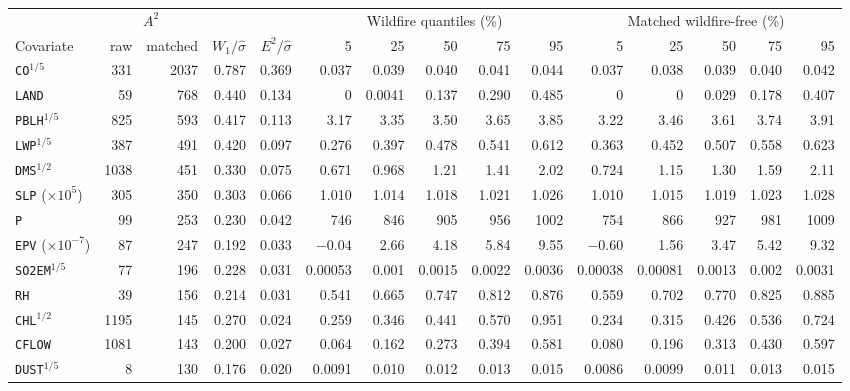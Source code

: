 \documentclass[11pt]{article}
\begin{document}
\begin{center}
\scriptsize
\setlength{\tabcolsep}{2.6pt}
\begin{tabular}{lrrrrrrrrrrrrrr}
\toprule
& \multicolumn{2}{c}{$A^2$} & & & \multicolumn{5}{c}{Wildfire quantiles (\%)} & \multicolumn{5}{c}{Matched wildfire-free (\%)} \\
\cmidrule(lr){2-3}\cmidrule(lr){6-10}\cmidrule(lr){11-15}
Covariate & raw & matched & $W_1/\hat\sigma$ & $E^2/\hat\sigma$ & 5 & 25 & 50 & 75 & 95 & 5 & 25 & 50 & 75 & 95 \\
\midrule
\texttt{CO}$^{1/5}$ & 331 & 2037 & 0.787 & 0.369 & 0.037 & 0.039 & 0.040 & 0.041 & 0.044 & 0.037 & 0.038 & 0.039 & 0.040 & 0.042 \\
\texttt{LAND} & 59 & 768 & 0.440 & 0.134 & 0 & 0.0041 & 0.137 & 0.290 & 0.485 & 0 & 0 & 0.029 & 0.178 & 0.407 \\
\texttt{PBLH}$^{1/5}$ & 825 & 593 & 0.417 & 0.113 & 3.17 & 3.35 & 3.50 & 3.65 & 3.85 & 3.22 & 3.46 & 3.61 & 3.74 & 3.91 \\
\texttt{LWP}$^{1/5}$ & 387 & 491 & 0.420 & 0.097 & 0.276 & 0.397 & 0.478 & 0.541 & 0.612 & 0.363 & 0.452 & 0.507 & 0.558 & 0.623 \\
\texttt{DMS}$^{1/2}$ & 1038 & 451 & 0.330 & 0.075 & 0.671 & 0.968 & 1.21 & 1.41 & 2.02 & 0.724 & 1.15 & 1.30 & 1.59 & 2.11 \\
\texttt{SLP} (${\times}10^{5}$) & 305 & 350 & 0.303 & 0.066 & 1.010 & 1.014 & 1.018 & 1.021 & 1.026 & 1.010 & 1.015 & 1.019 & 1.023 & 1.028 \\
\texttt{P} & 99 & 253 & 0.230 & 0.042 & 746 & 846 & 905 & 956 & 1002 & 754 & 866 & 927 & 981 & 1009 \\
\texttt{EPV} (${\times}10^{-7}$) & 87 & 247 & 0.192 & 0.033 & $-0.04$ & 2.66 & 4.18 & 5.84 & 9.55 & $-0.60$ & 1.56 & 3.47 & 5.42 & 9.32 \\
\texttt{SO2EM}$^{1/5}$ & 77 & 196 & 0.228 & 0.031 & 0.00053 & 0.001 & 0.0015 & 0.0022 & 0.0036 & 0.00038 & 0.00081 & 0.0013 & 0.002 & 0.0031 \\
\texttt{RH} & 39 & 156 & 0.214 & 0.031 & 0.541 & 0.665 & 0.747 & 0.812 & 0.876 & 0.559 & 0.702 & 0.770 & 0.825 & 0.885 \\
\texttt{CHL}$^{1/2}$ & 1195 & 145 & 0.270 & 0.024 & 0.259 & 0.346 & 0.441 & 0.570 & 0.951 & 0.234 & 0.315 & 0.426 & 0.536 & 0.724 \\
\texttt{CFLOW} & 1081 & 143 & 0.200 & 0.027 & 0.064 & 0.162 & 0.273 & 0.394 & 0.581 & 0.080 & 0.196 & 0.313 & 0.430 & 0.597 \\
\texttt{DUST}$^{1/5}$ & 8 & 130 & 0.176 & 0.020 & 0.0091 & 0.010 & 0.012 & 0.013 & 0.015 & 0.0086 & 0.0099 & 0.011 & 0.013 & 0.015 \\

\end{tabular}
\end{center}
\end{document}
